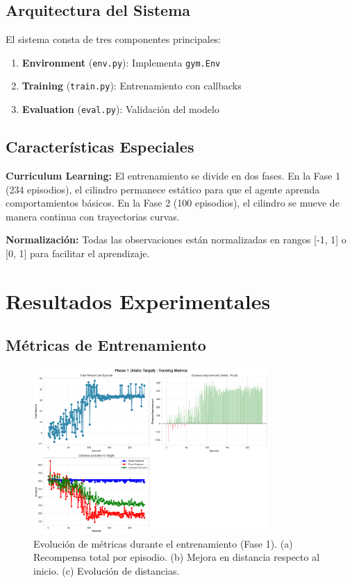 \documentclass[12pt,a4paper]{article}
\begin{document}
\subsection{Arquitectura del Sistema}

El sistema consta de tres componentes principales:

\begin{enumerate}
    \item \textbf{Environment} (\texttt{env.py}): Implementa \texttt{gym.Env}
    \item \textbf{Training} (\texttt{train.py}): Entrenamiento con callbacks
    \item \textbf{Evaluation} (\texttt{eval.py}): Validación del modelo
\end{enumerate}

\subsection{Características Especiales}

\textbf{Curriculum Learning:} El entrenamiento se divide en dos fases. En la Fase 1 (234 episodios), el cilindro permanece estático para que el agente aprenda comportamientos básicos. En la Fase 2 (100 episodios), el cilindro se mueve de manera continua con trayectorias curvas.

\textbf{Normalización:} Todas las observaciones están normalizadas en rangos [-1, 1] o [0, 1] para facilitar el aprendizaje.

\section{Resultados Experimentales}

\subsection{Métricas de Entrenamiento}

\begin{figure}[H]
    \centering
    \includegraphics[width=0.8\textwidth]{logs/episode_metrics_phase1.png}
    \caption{Evolución de métricas durante el entrenamiento (Fase 1). (a) Recompensa total por episodio. (b) Mejora en distancia respecto al inicio. (c) Evolución de distancias.}
    \label{fig:training_metrics_phase1}
\end{figure}
\end{document}
